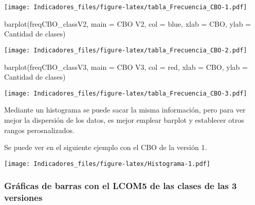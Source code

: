 \documentclass[
]{article}
\newenvironment{Shaded}{\begin{snugshade}}{\end{snugshade}}
\newcommand{\AttributeTok}[1]{\textcolor[rgb]{0.77,0.63,0.00}{#1}}
\newcommand{\FunctionTok}[1]{\textcolor[rgb]{0.00,0.00,0.00}{#1}}
\newcommand{\NormalTok}[1]{#1}
\newcommand{\SpecialCharTok}[1]{\textcolor[rgb]{0.00,0.00,0.00}{#1}}
\newcommand{\StringTok}[1]{\textcolor[rgb]{0.31,0.60,0.02}{#1}}
\begin{document}
\texttt{[image: Indicadores\_files/figure-latex/tabla\_Frecuencia\_CBO-1.pdf]}

\begin{Shaded}
\begin{Highlighting}[]
\FunctionTok{barplot}\NormalTok{(freqCBO\_classV2,}
        \AttributeTok{main =} \StringTok{\textquotesingle{}CBO V2\textquotesingle{}}\NormalTok{,}
        \AttributeTok{col =} \StringTok{\textquotesingle{}blue\textquotesingle{}}\NormalTok{,}
        \AttributeTok{xlab =} \StringTok{\textquotesingle{}CBO\textquotesingle{}}\NormalTok{,}
        \AttributeTok{ylab =} \StringTok{\textquotesingle{}Cantidad de clases\textquotesingle{}}\NormalTok{)}
\end{Highlighting}
\end{Shaded}

\texttt{[image: Indicadores\_files/figure-latex/tabla\_Frecuencia\_CBO-2.pdf]}

\begin{Shaded}
\begin{Highlighting}[]
\FunctionTok{barplot}\NormalTok{(freqCBO\_classV3,}
        \AttributeTok{main =} \StringTok{\textquotesingle{}CBO V3\textquotesingle{}}\NormalTok{,}
        \AttributeTok{col =} \StringTok{\textquotesingle{}red\textquotesingle{}}\NormalTok{,}
        \AttributeTok{xlab =} \StringTok{\textquotesingle{}CBO\textquotesingle{}}\NormalTok{,}
        \AttributeTok{ylab =} \StringTok{\textquotesingle{}Cantidad de clases\textquotesingle{}}\NormalTok{)}
\end{Highlighting}
\end{Shaded}

\texttt{[image: Indicadores\_files/figure-latex/tabla\_Frecuencia\_CBO-3.pdf]}

Mediante un histograma se puede sacar la misma información, pero para
ver mejor la dispersión de los datos, es mejor emplear barplot y
establecer otros rangos perosnalizados.

Se puede ver en el siguiente ejemplo con el CBO de la versión 1.

\begin{Shaded}
\end{Shaded}

\texttt{[image: Indicadores\_files/figure-latex/Histograma-1.pdf]}

\hypertarget{gruxe1ficas-de-barras-con-el-lcom5-de-las-clases-de-las-3-versiones}{%
\subsubsection{Gráficas de barras con el LCOM5 de las clases de las 3
versiones}\label{gruxe1ficas-de-barras-con-el-lcom5-de-las-clases-de-las-3-versiones}}
\end{document}
